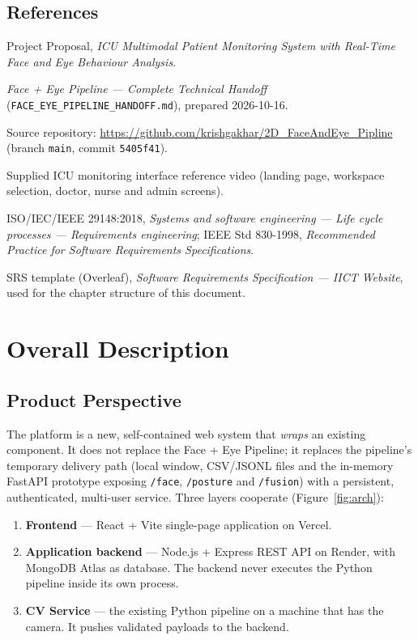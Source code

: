 \documentclass[a4paper,11pt]{scrreprt}
\newcommand{\code}[1]{\texttt{#1}}
\begin{document}
\section{References}
\begin{enumerate}[label={[\arabic*]}]
  \item Project Proposal, \emph{ICU Multimodal Patient Monitoring System with Real-Time Face and Eye Behaviour Analysis}.
  \item \emph{Face + Eye Pipeline --- Complete Technical Handoff} (\code{FACE_EYE_PIPELINE_HANDOFF.md}), prepared 2026-10-16.
  \item Source repository: \url{https://github.com/krishgakhar/2D_FaceAndEye_Pipline} (branch \code{main}, commit \code{5405f41}).
  \item Supplied ICU monitoring interface reference video (landing page, workspace selection, doctor, nurse and admin screens).
  \item ISO/IEC/IEEE 29148:2018, \emph{Systems and software engineering --- Life cycle processes --- Requirements engineering}; IEEE Std 830-1998, \emph{Recommended Practice for Software Requirements Specifications}.
  \item SRS template (Overleaf), \emph{Software Requirements Specification --- IICT Website}, used for the chapter structure of this document.
\end{enumerate}

\chapter{Overall Description}

\section{Product Perspective}
The platform is a new, self-contained web system that \emph{wraps} an existing component. It does not replace the Face + Eye Pipeline; it replaces the pipeline's temporary delivery path (local window, CSV/JSONL files and the in-memory FastAPI prototype exposing \code{/face}, \code{/posture} and \code{/fusion}) with a persistent, authenticated, multi-user service. Three layers cooperate (Figure~\ref{fig:arch}):

\begin{enumerate}
  \item \textbf{Frontend} --- React + Vite single-page application on Vercel.
  \item \textbf{Application backend} --- Node.js + Express REST API on Render, with MongoDB Atlas as database. The backend never executes the Python pipeline inside its own process.
  \item \textbf{CV Service} --- the existing Python pipeline on a machine that has the camera. It pushes validated payloads to the backend.
\end{enumerate}
\end{document}
